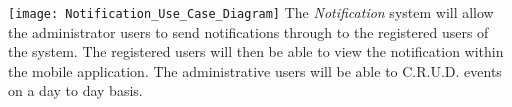{
\texttt{[image: Notification\_Use\_Case\_Diagram]}
The \textit{Notification} system will allow the administrator users to send notifications through to the registered users of the system.
The registered users will then be able to view the notification within the mobile application.
The administrative users will be able to C.R.U.D. events on a day to day basis.
}
